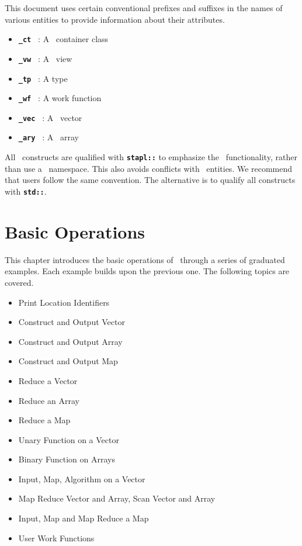\documentclass{report}
\begin{document}
This document uses certain conventional prefixes and suffixes
in the names of various entities to provide information about their
attributes.

\begin{itemize}
\item
\texttt{{\bf \_ct }}
: A \stapl\ container class
\item
\texttt{{\bf \_vw }}
: A \stapl\ view
\item
\texttt{{\bf \_tp }}
: A type
\item
\texttt{{\bf \_wf }}
: A work function
\item
\texttt{{\bf \_vec }}
: A \stapl\ vector
\item
\texttt{{\bf \_ary }}
: A \stapl\ array
\end{itemize}

All \stapl\ constructs are qualified with
\texttt{{\bf stapl::}}
to emphasize the \stapl\ functionality, rather than use a
\stapl\ namespace.
This also avoids conflicts with \stl\ entities.  We recommend that users
follow the same convention.  The alternative is to qualify all
constructs with
\texttt{{\bf std::}}.


\chapter{Basic Operations}

This chapter introduces the basic operations of \stapl\ through a series
of graduated examples.  Each example builds upon the previous one.
The following topics are covered.

\begin{itemize}
\item
Print Location Identifiers
\item
Construct and Output Vector
\item
Construct and Output Array
\item
Construct and Output Map
\item
Reduce a Vector
\item
Reduce an Array
\item
Reduce a Map
\item
Unary Function on a Vector
\item
Binary Function on Arrays
\item
Input, Map, Algorithm on a Vector
\item
Map Reduce Vector and Array, Scan Vector and Array
\item
Input, Map and Map Reduce a Map
\item
User Work Functions
\end{itemize}
\end{document}
